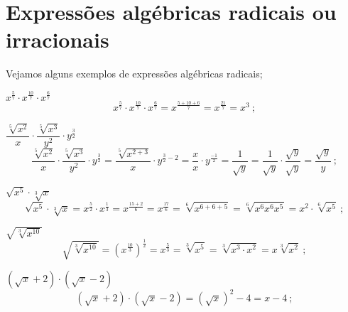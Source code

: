  \section{Expressões algébricas radicais ou irracionais}
 
 Vejamos alguns exemplos de expressões algébricas radicais;
 
 \begin{exem}   
   $x^{\frac{5}{7}} \cdot x^{\frac{10}{7}} \cdot x^{\frac{6}{7}}$
\begin{equation}
x^{\frac{5}{7}} \cdot x^{\frac{10}{7}} \cdot x^{\frac{6}{7}}= x^{\frac{5+10+6}{7}}= x^{\frac{21}{7}}= x^3 \ ;
\end{equation}
    \end{exem}
 
 \begin{exem}
   $\dfrac{\sqrt[5]{x^2}}{x} \cdot \dfrac{\sqrt[5]{x^3}}{y^2} \cdot y^{\frac{3}{2}}$
\begin{equation}
\dfrac{\sqrt[5]{x^2}}{x} \cdot \dfrac{\sqrt[5]{x^3}}{y^2} \cdot y^{\frac{3}{2}}= \dfrac{\sqrt[5]{x^{2+3}}}{x} \cdot y^{\frac{3}{2} - 2}= \dfrac{x}{x} \cdot y^{\frac{-1}{2}}= \dfrac{1}{\sqrt{y}}= \dfrac{1}{\sqrt{y}} \cdot \dfrac{\sqrt{y}}{\sqrt{y}}= \dfrac{\sqrt{y}}{y} \ ;
\end{equation}
   \end{exem}
 
 \begin{exem}
    $\sqrt{x^5} \cdot \sqrt[3]{x}$
\begin{equation}
\sqrt{x^5} \cdot \sqrt[3]{x}= x^{\frac{5}{2}} \cdot x^{\frac{1}{3}}= x^{\frac{15+2}{6}} = x^{\frac{17}{6}} = \sqrt[6]{x^{6+6+5}}= \sqrt[6]{x^6 x^6 x^5} =  x^2 \cdot \sqrt[6]{x^5} \ ;
\end{equation}
   \end{exem}
 
 \begin{exem}
   $\sqrt{\sqrt[3]{x^{10}}}$
\begin{equation}
\sqrt{\sqrt[3]{x^{10}}}= (x^{\frac{10}{3}})^{\frac{1}{2}}= x^{\frac{5}{3}}= \sqrt[3]{x^5}= \sqrt[3]{x^3 \cdot x^2}= x \sqrt[3]{x^2} \ ;
\end{equation}
   \end{exem}
 
 \begin{exem}
    $(\sqrt{x} + 2) \cdot (\sqrt{x} - 2)$
\begin{equation}
(\sqrt{x} + 2) \cdot (\sqrt{x} - 2)= (\sqrt{x})^2 - 4= x-4 \ ;
\end{equation}
   \end{exem}
 
